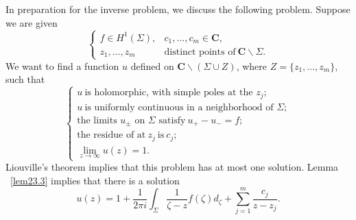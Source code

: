 \documentclass{surv-l}
\theoremstyle{plain}
\theoremstyle{definition}
\numberwithin{equation}{chapter}
\begin{document}
In preparation for the inverse problem, we discuss the following problem. Suppose we are given
\renewcommand\theequation{23.15}
\setcounter{equation}{14}
\begin{equation}
\left\{\begin{array}{lc}
f\in H^{1}(\Sigma), & c_{1},\ldots,c_{m}\in \mathbf{C},\\
z_{1},\ldots,z_{m} & \text{distinct points of}\ \mathbf{C}\backslash \Sigma.
\end{array}\right.
\end{equation}
We want to find a function $u$ defined on $\textbf{C}\backslash (\Sigma\cup Z)$, where $Z=\{z_{1},\ldots, z_{m}\}$, such that
\renewcommand\theequation{23.16}
\setcounter{equation}{15}
\begin{equation}\label{eq23.16}
\left\{\begin{array}{l}
u\ \text{is holomorphic, with simple poles at the } z_{j};\\
u\ \text{is uniformly continuous in a neighborhood of } \Sigma;\\
\text{the limits $u_\pm$ on $\Sigma$ satisfy}\ u_{+}-u_{-}=f;\\
\text{the residue of at}\ z_{j}\ \text{is}\ c_{j};\\
\lim_{z\rightarrow\infty}u(z)=1.
\end{array}\right.
\end{equation}
Liouville's theorem implies that this problem has at most one solution. Lemma ~\ref{lem23.3} implies that there is a solution
\renewcommand\theequation{23.17}
\setcounter{equation}{16}
\begin{equation}\label{eq23.17}
u(z)=1+\frac{1}{2\pi i}\int_{\Sigma}\frac{1}{\zeta-z}f(\zeta)d_{\zeta}+\sum_{j=1}^{m}\frac{c_{j}}{z-z_{j}}.
\end{equation}
\end{document}
